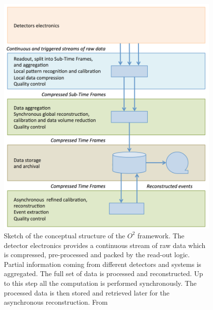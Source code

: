 \begin{figure}[!t]
\begin{center}
\includegraphics[width=0.95\linewidth]{Chapters/O2/Figs/O2.pdf}
\caption{Sketch of the conceptual structure of the $O^2$ framework. The detector electronics provides a continuous stream of raw data which is compressed, pre-processed and packed by the read-out logic. Partial information coming from different detectors and systems is aggregated. The full set of data is processed and reconstructed. Up to this step all the computation is performed synchronously. The processed data is then stored and retrieved later for the asynchronous reconstruction. From \cite{Buncic:2011297}}
\label{fig:O2_sketch}
\end{center}
\end{figure}

